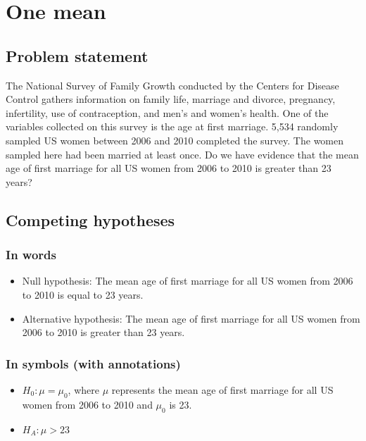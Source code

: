 \documentclass[12pt,]{krantz}
\providecommand{\tightlist}{%
  \setlength{\itemsep}{0pt}\setlength{\parskip}{0pt}}
\begin{document}
\section{One mean}\label{one-mean}

\subsection{Problem statement}\label{problem-statement}

The National Survey of Family Growth conducted by the Centers for
Disease Control gathers information on family life, marriage and
divorce, pregnancy, infertility, use of contraception, and men's and
women's health. One of the variables collected on this survey is the age
at first marriage. 5,534 randomly sampled US women between 2006 and 2010
completed the survey. The women sampled here had been married at least
once. Do we have evidence that the mean age of first marriage for all US
women from 2006 to 2010 is greater than 23 years? \citep[Tweaked a bit
from][ {[}Chapter 4{]}]{isrs2014}

\subsection{Competing hypotheses}\label{competing-hypotheses}

\subsubsection*{In words}\label{in-words}


\begin{itemize}
\item
  Null hypothesis: The mean age of first marriage for all US women from
  2006 to 2010 is equal to 23 years.
\item
  Alternative hypothesis: The mean age of first marriage for all US
  women from 2006 to 2010 is greater than 23 years.
\end{itemize}

\subsubsection*{In symbols (with
annotations)}\label{in-symbols-with-annotations}


\begin{itemize}
\tightlist
\item
  \(H_0: \mu = \mu_{0}\), where \(\mu\) represents the mean age of first
  marriage for all US women from 2006 to 2010 and \(\mu_0\) is 23.
\item
  \(H_A: \mu > 23\)
\end{itemize}
\end{document}
